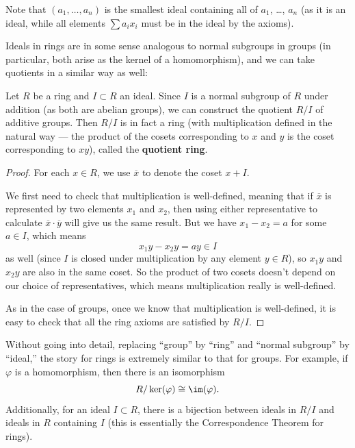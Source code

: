 Note that $(a_1, \ldots, a_n)$ is the smallest ideal containing all of $a_1$, \ldots, $a_n$ (as it is an ideal, while all elements $\sum a_ix_i$ must be in the ideal by the axioms). 

Ideals in rings are in some sense analogous to normal subgroups in groups (in particular, both arise as the kernel of a homomorphism), and we can take quotients in a similar way as well:

\begin{proposition}
Let $R$ be a ring and $I \subset R$ an ideal. Since $I$ is a normal subgroup of $R$ under addition (as both are abelian groups), we can construct the quotient $R/I$ of additive groups. Then $R/I$ is in fact a ring (with multiplication defined in the natural way --- the product of the cosets corresponding to $x$ and $y$ is the coset corresponding to $xy$), called the \textbf{quotient ring}. 
\end{proposition}

\begin{proof}
For each $x \in R$, we use $\overline{x}$ to denote the coset $x + I$. 

We first need to check that multiplication is well-defined, meaning that if $\overline{x}$ is represented by two elements $x_1$ and $x_2$, then using either representative to calculate $\overline{x}\cdot \overline{y}$ will give us the same result. But we have $x_1 - x_2 = a$ for some $a \in I$, which means \[x_1y - x_2y = ay \in I\] as well (since $I$ is closed under multiplication by any element $y \in R$), so $x_1y$ and $x_2y$ are also in the same coset. So the product of two cosets doesn't depend on our choice of representatives, which means multiplication really is well-defined. 

As in the case of groups, once we know that multiplication is well-defined, it is easy to check that all the ring axioms are satisfied by $R/I$. 
\end{proof}

Without going into detail, replacing ``group'' by ``ring'' and ``normal subgroup'' by ``ideal,'' the story for rings is extremely similar to that for groups. For example, if $\varphi$ is a homomorphism, then there is an isomorphism \[R/\ker(\varphi) \cong \im(\varphi).\] Additionally, for an ideal $I \subset R$, there is a bijection between ideals in $R/I$ and ideals in $R$ containing $I$ (this is essentially the Correspondence Theorem for rings). 

